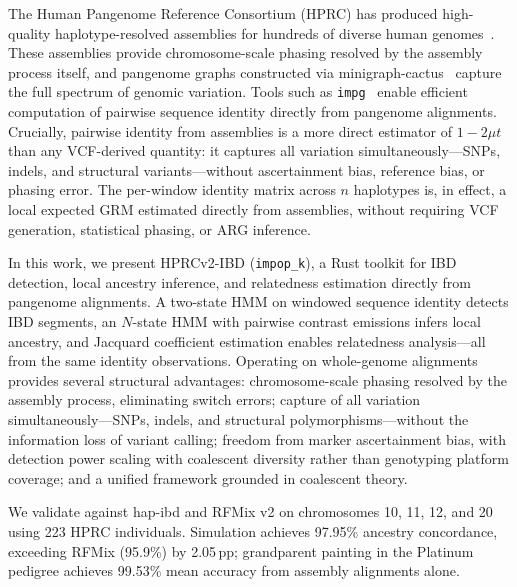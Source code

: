 The Human Pangenome Reference Consortium (HPRC) has produced high-quality haplotype-resolved assemblies for hundreds of diverse human genomes~\cite{liao2023hprc}. These assemblies provide chromosome-scale phasing resolved by the assembly process itself, and pangenome graphs constructed via minigraph-cactus~\cite{hickey2024minigraph_cactus} capture the full spectrum of genomic variation. Tools such as \texttt{impg}~\cite{impg} enable efficient computation of pairwise sequence identity directly from pangenome alignments. Crucially, pairwise identity from assemblies is a more direct estimator of $1 - 2\mu t$ than any VCF-derived quantity: it captures all variation simultaneously---SNPs, indels, and structural variants---without ascertainment bias, reference bias, or phasing error. The per-window identity matrix across $n$ haplotypes is, in effect, a local expected GRM estimated directly from assemblies, without requiring VCF generation, statistical phasing, or ARG inference.

In this work, we present HPRCv2-IBD (\texttt{impop\_k}), a Rust toolkit for IBD detection, local ancestry inference, and relatedness estimation directly from pangenome alignments. A two-state HMM on windowed sequence identity detects IBD segments, an $N$-state HMM with pairwise contrast emissions infers local ancestry, and Jacquard coefficient estimation enables relatedness analysis---all from the same identity observations. Operating on whole-genome alignments provides several structural advantages: chromosome-scale phasing resolved by the assembly process, eliminating switch errors; capture of all variation simultaneously---SNPs, indels, and structural polymorphisms---without the information loss of variant calling; freedom from marker ascertainment bias, with detection power scaling with coalescent diversity rather than genotyping platform coverage; and a unified framework grounded in coalescent theory.

We validate against hap-ibd and RFMix v2 on chromosomes 10, 11, 12, and 20 using 223 HPRC individuals. Simulation achieves 97.95\% ancestry concordance, exceeding RFMix (95.9\%) by 2.05\,pp; grandparent painting in the Platinum pedigree achieves 99.53\% mean accuracy from assembly alignments alone.
